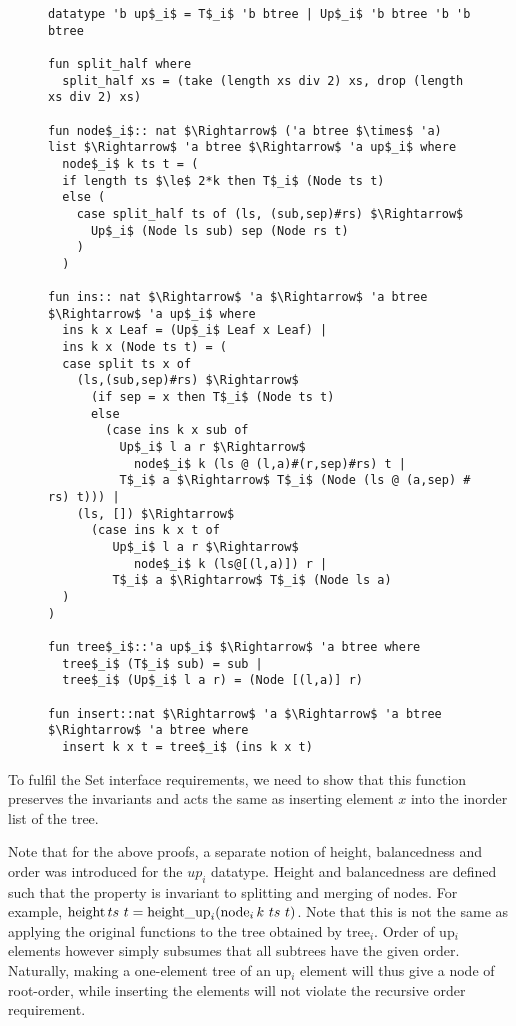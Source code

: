 \begin{figure}
    
\begin{lstlisting}[mathescape=true, language=Isabelle, label=lst:ins-fun, caption={
    The \textit{insert} function
}]
datatype 'b up$_i$ = T$_i$ 'b btree | Up$_i$ 'b btree 'b 'b btree

fun split_half where
  split_half xs = (take (length xs div 2) xs, drop (length xs div 2) xs)

fun node$_i$:: nat $\Rightarrow$ ('a btree $\times$ 'a) list $\Rightarrow$ 'a btree $\Rightarrow$ 'a up$_i$ where
  node$_i$ k ts t = (
  if length ts $\le$ 2*k then T$_i$ (Node ts t)
  else (
    case split_half ts of (ls, (sub,sep)#rs) $\Rightarrow$
      Up$_i$ (Node ls sub) sep (Node rs t)
    )
  )

fun ins:: nat $\Rightarrow$ 'a $\Rightarrow$ 'a btree $\Rightarrow$ 'a up$_i$ where
  ins k x Leaf = (Up$_i$ Leaf x Leaf) |
  ins k x (Node ts t) = (
  case split ts x of
    (ls,(sub,sep)#rs) $\Rightarrow$ 
      (if sep = x then T$_i$ (Node ts t)
      else
        (case ins k x sub of 
          Up$_i$ l a r $\Rightarrow$
            node$_i$ k (ls @ (l,a)#(r,sep)#rs) t | 
          T$_i$ a $\Rightarrow$ T$_i$ (Node (ls @ (a,sep) # rs) t))) |
    (ls, []) $\Rightarrow$
      (case ins k x t of
         Up$_i$ l a r $\Rightarrow$
            node$_i$ k (ls@[(l,a)]) r |
         T$_i$ a $\Rightarrow$ T$_i$ (Node ls a)
  )
)

fun tree$_i$::'a up$_i$ $\Rightarrow$ 'a btree where
  tree$_i$ (T$_i$ sub) = sub |
  tree$_i$ (Up$_i$ l a r) = (Node [(l,a)] r)

fun insert::nat $\Rightarrow$ 'a $\Rightarrow$ 'a btree $\Rightarrow$ 'a btree where
  insert k x t = tree$_i$ (ins k x t)
\end{lstlisting}

\end{figure}

To fulfil the Set interface requirements,
we need to show that this function preserves the invariants
and acts the same as inserting element $x$ into the inorder list of the tree.

Note that for the above proofs, a separate notion of height, balancedness and order
was introduced for the $up_i$ datatype.
Height and balancedness are
defined such that the property is invariant to splitting and merging of nodes.
For example, $\height ts\ t = \heightup_i (\node_i k\ ts\ t)$.
Note that this is not the same as applying the original functions
to the tree obtained by tree$_i$.
Order of up$_i$ elements however simply subsumes that all subtrees have
the given order.
Naturally, making a one-element tree of an up$_i$ element will thus
give a node of root-order, while inserting the elements
will not violate the recursive order requirement.

